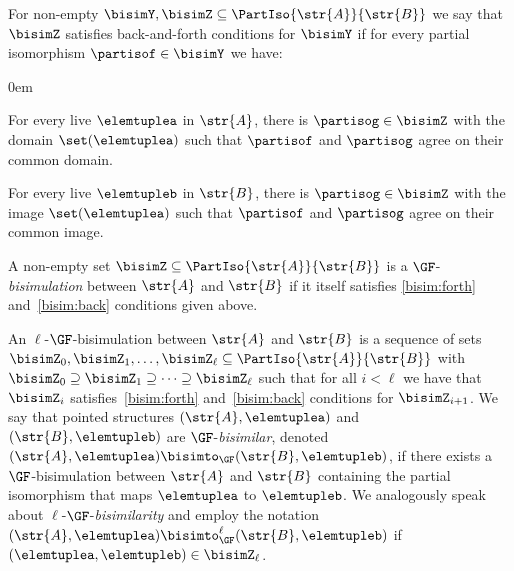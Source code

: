 \begin{definition}
For non-empty $\bisimY, \bisimZ \subseteq \PartIso{\str{A}}{\str{B}}$ we say that $\bisimZ$ satisfies back-and-forth conditions for $\bisimY$ if for every partial isomorphism $\partisof \in \bisimY$ we have:
%
\begin{description}\itemsep0em
  \item[\desclabel{(Forth)}{bisim:forth}] For every live $\elemtuplea$ in $\str{A}$, there is $\partisog \in \bisimZ$ with the domain $\set(\elemtuplea)$ such that $\partisof$ and $\partisog$ agree on their common domain.
  \item[\desclabel{(Back)}{bisim:back}] For every live $\elemtupleb$ in $\str{B}$, there is $\partisog \in \bisimZ$ with the image $\set(\elemtuplea)$ such that $\partisof$ and $\partisog$ agree on their common image.
\end{description}
A non-empty set $\bisimZ \subseteq \PartIso{\str{A}}{\str{B}}$ is a $\GF$-\emph{bisimulation} between $\str{A}$ and $\str{B}$ if it itself satisfies \ref{bisim:forth} and~\ref{bisim:back} conditions given above.
\end{definition}
An $\ell$-$\GF$-bisimulation between $\str{A}$ and $\str{B}$ is a sequence of sets $\bisimZ_0, \bisimZ_1, \ldots, \bisimZ_\ell \subseteq \PartIso{\str{A}}{\str{B}}$ with $\bisimZ_{0} \supseteq \bisimZ_{1} \supseteq \cdots \supseteq \bisimZ_{\ell}$ such that for all $i < \ell$ we have that $\bisimZ_i$ satisfies~\ref{bisim:forth} and~\ref{bisim:back} conditions for $\bisimZ_{i{+}1}$.
We say that pointed structures $(\str{A}, \elemtuplea)$ and~$(\str{B}, \elemtupleb)$ are $\GF$-\emph{bisimilar}, denoted $(\str{A}, \elemtuplea) \bisimto_{\GF} (\str{B}, \elemtupleb)$, if there exists a $\GF$-bisimulation between $\str{A}$ and $\str{B}$ containing the partial isomorphism that maps $\elemtuplea$ to $\elemtupleb$.
We analogously speak about $\ell$-$\GF$-\emph{bisimilarity} and employ the notation $(\str{A}, \elemtuplea) \bisimto_{\GF}^{\ell} (\str{B}, \elemtupleb)$ if $(\elemtuplea, \elemtupleb) \in \bisimZ_{\ell}$.

